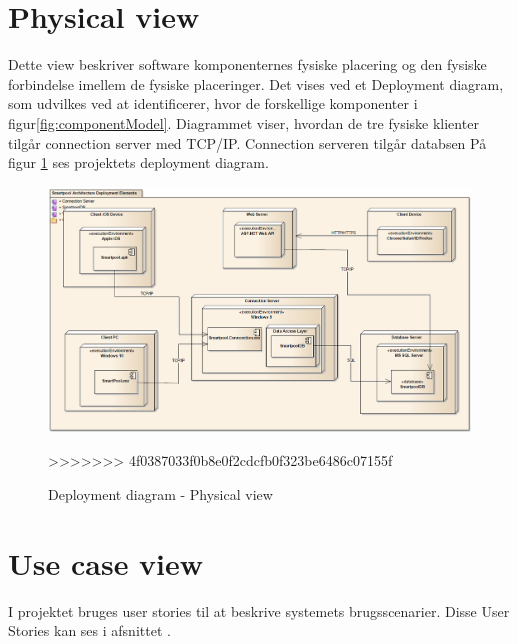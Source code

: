 \section{Physical view}
Dette view beskriver software komponenternes fysiske placering og den fysiske forbindelse imellem de fysiske placeringer. Det vises ved et Deployment diagram, som udvilkes ved at identificerer, hvor de forskellige komponenter i figur\ref{fig:componentModel}. Diagrammet viser, hvordan de tre fysiske klienter tilgår connection server med TCP/IP. Connection serveren tilgår databsen 
På figur \ref{fig:deploymentView} ses projektets deployment diagram.

\begin{figure}
	\centering
	\includegraphics[width=\linewidth]{figs/arkitektur/deploymentView.PNG}
	\caption{Deployment diagram - Physical view}
	\label{fig:deploymentView}
>>>>>>> 4f0387033f0b8e0f2cdcfb0f323be6486c07155f
\end{figure}

\section{Use case view}
I projektet bruges user stories til at beskrive systemets brugsscenarier. Disse User Stories kan ses i afsnittet .

